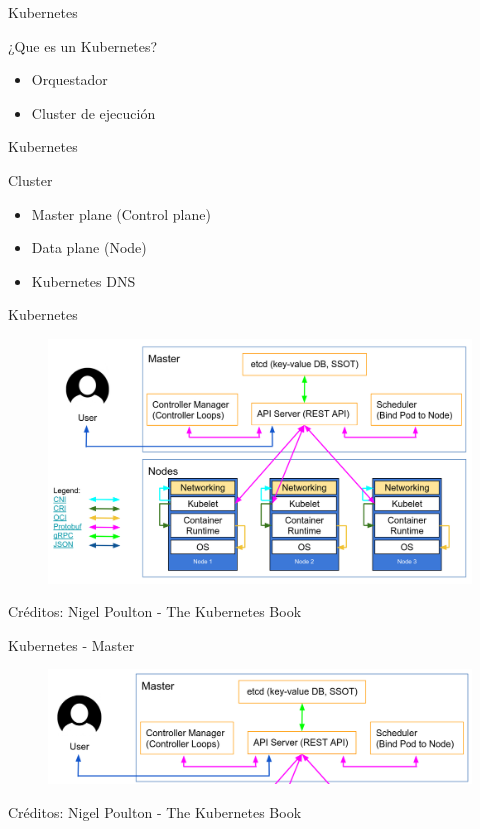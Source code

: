 \documentclass[aspectratio=169]{beamer}
\begin{document}
\begin{frame}{Kubernetes}

    \begin{alertblock}{¿Que es un Kubernetes?}
        \begin{itemize}
            \item Orquestador
            \item Cluster de ejecución
        \end{itemize}
    \end{alertblock}

\end{frame}

\begin{frame}{Kubernetes}

    \begin{alertblock}{Cluster}
        \begin{itemize}
            \item Master plane (Control plane)
            \item Data plane (Node)
            \item Kubernetes DNS
        \end{itemize}
    \end{alertblock}

\end{frame}

\begin{frame}{Kubernetes}
    \begin{figure}
        \centering
        \includegraphics[width=0.7\linewidth]{Images/kuberarch.png}
    \end{figure}
Créditos: Nigel Poulton - The Kubernetes Book
\end{frame}

\begin{frame}{Kubernetes - Master}
    \begin{figure}
        \centering
        \includegraphics[width=0.8\linewidth]{Images/kuberarchmaster.png}
    \end{figure}
Créditos: Nigel Poulton - The Kubernetes Book
\end{frame}
\end{document}
